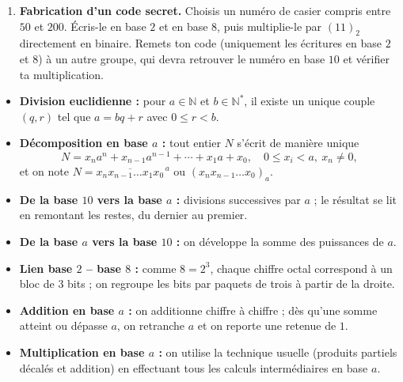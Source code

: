 \documentclass[11pt]{article}
\newcounter{popsec}
\newcounter{popsub}
\newcommand{\courssub}[1]{%
  \stepcounter{popsub}%
  \par\vspace{9pt}\noindent{\popxbold\fontsize{11.5}{13}\selectfont\color{popink}{\color{poporange}\thepopsec.\thepopsub}\hspace{6pt}#1}\par\nopagebreak\vspace{4pt}
}
\begin{document}
\begin{enumerate}
\begin{enumerate}
\item Pose et effectue l'addition $(1101)_2 + (1011)_2$ en base $2$, en indiquant les retenues.
\item Vérifie le résultat en convertissant les trois nombres en base $10$.
\item Le gardien affirme : « le dernier casier de l'annexe porte le numéro octal $(30)_8$ ». A-t-il raison ?
\end{enumerate}
\item \textbf{Fabrication d'un code secret.} Choisis un numéro de casier compris entre $50$ et $200$. Écris-le en base $2$ et en base $8$, puis multiplie-le par $(11)_2$ directement en binaire. Remets ton code (uniquement les écritures en base $2$ et $8$) à un autre groupe, qui devra retrouver le numéro en base $10$ et vérifier ta multiplication.
\end{enumerate}

\courssub{Ressources à mobiliser}

\begin{aretenir}
\begin{itemize}
\item \textbf{Division euclidienne :} pour $a \in \mathbb{N}$ et $b \in \mathbb{N}^*$, il existe un unique couple $(q, r)$ tel que $a = bq + r$ avec $0 \leq r < b$.
\item \textbf{Décomposition en base $a$ :} tout entier $N$ s'écrit de manière unique
\[ N = x_n a^n + x_{n-1} a^{n-1} + \cdots + x_1 a + x_0, \quad 0 \leq x_i < a,\ x_n \neq 0, \]
et on note $N = \overline{x_n x_{n-1} \ldots x_1 x_0}^{\,a}$ ou $(x_n x_{n-1} \ldots x_0)_a$.
\item \textbf{De la base $10$ vers la base $a$ :} divisions successives par $a$ ; le résultat se lit en remontant les restes, du dernier au premier.
\item \textbf{De la base $a$ vers la base $10$ :} on développe la somme des puissances de $a$.
\item \textbf{Lien base $2$ -- base $8$ :} comme $8 = 2^3$, chaque chiffre octal correspond à un bloc de $3$ bits ; on regroupe les bits par paquets de trois à partir de la droite.
\item \textbf{Addition en base $a$ :} on additionne chiffre à chiffre ; dès qu'une somme atteint ou dépasse $a$, on retranche $a$ et on reporte une retenue de $1$.
\item \textbf{Multiplication en base $a$ :} on utilise la technique usuelle (produits partiels décalés et addition) en effectuant tous les calculs intermédiaires en base $a$.
\end{itemize}
\end{aretenir}
\end{document}

